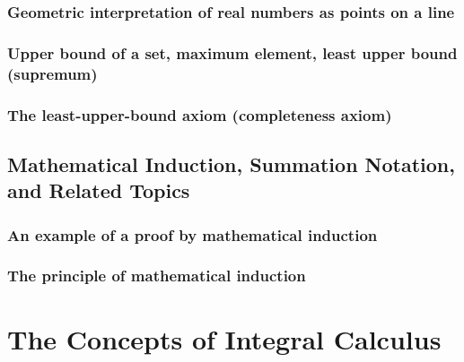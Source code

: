 \documentclass[cn,11pt,chinese]{elegantbook}
\numberwithin{equation}{section}
\begin{document}
\subsection{Geometric interpretation of real numbers as points on a line}


\subsection{Upper bound of a set, maximum element, least upper bound (supremum)}


\subsection{The least-upper-bound axiom (completeness axiom)}



\section{Mathematical Induction, Summation Notation, and Related Topics}\label{section00104}

\subsection{An example of a proof by mathematical induction}\label{section0010401}



\subsection{The principle of mathematical induction}\label{section0010402}


\chapter{The Concepts of Integral Calculus}\label{chapter002}








% 

\appendix
\end{document}

